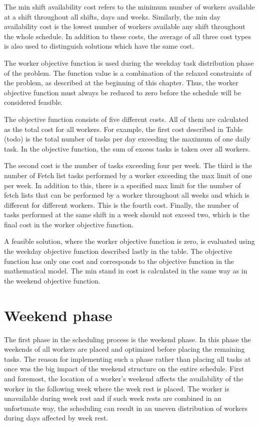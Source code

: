 The min shift availability cost refers to the minimum number of workers available at a shift throughout all shifts, days and weeks. Similarly, the min day availability cost is the lowest number of workers available any shift throughout the whole schedule. In addition to these costs, the average of all three cost types is also used to distinguish solutions which have the same cost.

The worker objective function is used during the weekday task distribution phase of the problem. The function value is a combination of the relaxed constraints of the problem, as described at the beginning of this chapter. Thus, the worker objective function must always be reduced to zero before the schedule will be considered feasible.

The objective function consists of five different costs. All of them are calculated as the total cost for all workers. For example, the first cost described in Table (todo) is the total number of tasks per day exceeding the maximum of one daily task. In the objective function, the sum of excess tasks is taken over all workers.

The second cost is the number of tasks exceeding four per week. The third is the number of Fetch list tasks performed by a worker exceeding the max limit of one per week. In addition to this, there is a specified max limit for the number of fetch lists that can be performed by a worker throughout all weeks and which is different for different workers. This is the fourth cost. Finally, the number of tasks performed at the same shift in a week should not exceed two, which is the final cost in the worker objective function.

A feasible solution, where the worker objective function is zero, is evaluated using the weekday objective function described lastly in the table. The objective function has only one cost and corresponds to the objective function in the mathematical model. The min stand in cost is calculated in the same way as in the weekend objective function.

\section{Weekend phase}

The first phase in the scheduling process is the weekend phase. In this phase the weekends of all workers are placed and optimized before placing the remaining tasks. The reason for implementing such a phase rather than placing all tasks at once was the big impact of the weekend structure on the entire schedule. First and foremost, the location of a worker's weekend affects the availability of the worker in the following week where the week rest is placed. The worker is unavailable during week rest and if such week rests are combined in an unfortunate way, the scheduling can result in an uneven distribution of workers during days affected by week rest.

